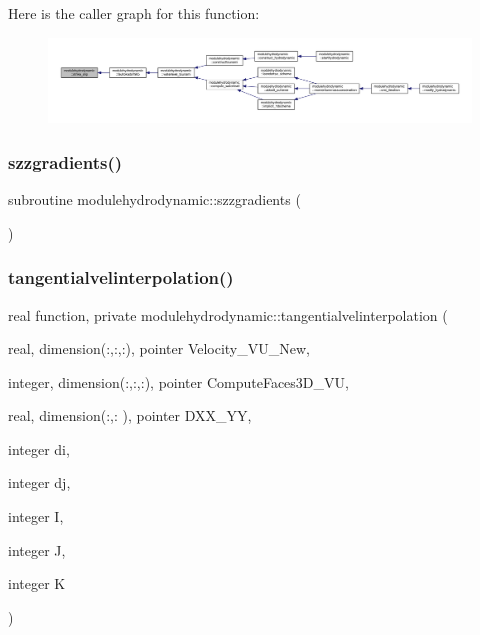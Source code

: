 Here is the caller graph for this function\+:\nopagebreak
\begin{figure}[H]
\begin{center}
\leavevmode
\includegraphics[width=350pt]{namespacemodulehydrodynamic_a38a2568403edbdf1d10000f553f39252_icgraph}
\end{center}
\end{figure}
\mbox{\label{namespacemodulehydrodynamic_a38e7a7184b963c8e5a55ddb911180c72}} 
\subsubsection{\texorpdfstring{szzgradients()}{szzgradients()}}
{\footnotesize\ttfamily subroutine modulehydrodynamic\+::szzgradients (\begin{DoxyParamCaption}{ }\end{DoxyParamCaption})\hspace{0.3cm}{\ttfamily [private]}}

\mbox{\label{namespacemodulehydrodynamic_a9df5dd894a61d9599540be689d68c03b}} 
\subsubsection{\texorpdfstring{tangentialvelinterpolation()}{tangentialvelinterpolation()}}
{\footnotesize\ttfamily real function, private modulehydrodynamic\+::tangentialvelinterpolation (\begin{DoxyParamCaption}\item[{real, dimension(\+:,\+:,\+:), pointer}]{Velocity\+\_\+\+V\+U\+\_\+\+New,  }\item[{integer, dimension(\+:,\+:,\+:), pointer}]{Compute\+Faces3\+D\+\_\+\+VU,  }\item[{real, dimension(\+:,\+:  ), pointer}]{D\+X\+X\+\_\+\+YY,  }\item[{integer}]{di,  }\item[{integer}]{dj,  }\item[{integer}]{I,  }\item[{integer}]{J,  }\item[{integer}]{K }\end{DoxyParamCaption})\hspace{0.3cm}{\ttfamily [private]}}

